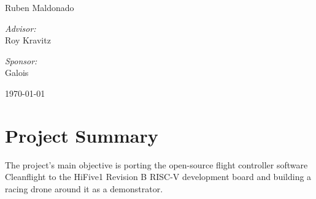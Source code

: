 \begin{titlepage}
	\begin{minipage}{\textwidth}
		\begin{center}
			Ruben Maldonado \\ %
		\end{center}
	\end{minipage}
\newline
\newline

	\begin{minipage}{\textwidth}
		\begin{center}
			\Large
			\textit{Advisor:}\\ Roy Kravitz %
		\end{center}
	\end{minipage}
\newline
\newline

	\begin{minipage}{\textwidth}
		\begin{center}
			\Large
			\textit{Sponsor:}\\ Galois %
		\end{center}
	\end{minipage}
	
	\vfill\vfill\vfill %
	{\large\today} %
	
	
	\vfill\vfill
	\vfill %
	
\end{titlepage}
\pagestyle{plain}
\tableofcontents
\newpage

\section{Project Summary}

The project’s main objective is porting the open-source flight controller software Cleanflight to the HiFive1 Revision B RISC-V development board and building a racing drone around it as a demonstrator. 

